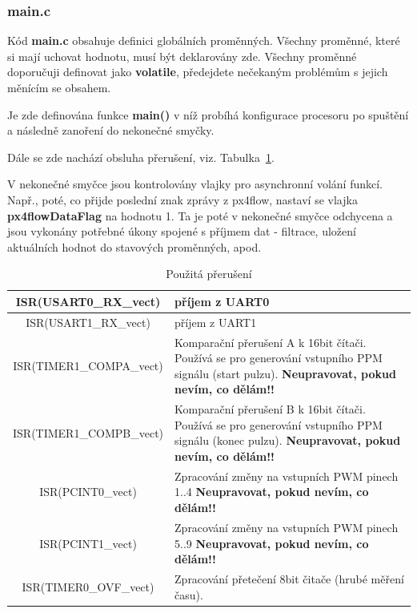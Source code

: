 \documentclass[11pt, a4paper]{article}
\begin{document}
\subsubsection{main.c}

Kód \textbf{main.c} obsahuje definici globálních proměnných. Všechny proměnné, které si mají uchovat hodnotu, musí být deklarovány zde. Všechny proměnné doporučuji definovat jako \textbf{volatile}, předejdete nečekaným problémům s jejich měnícím se obsahem.

Je zde definována funkce \textbf{main()} v níž probíhá konfigurace procesoru po spuštění a následně zanoření do nekonečné smyčky.

Dále se zde nachází obsluha přerušení, viz. Tabulka~\ref{tab:interrupts}.

V nekonečné smyčce jsou kontrolovány vlajky pro asynchronní volání funkcí. Např., poté, co přijde poslední znak zprávy z px4flow, nastaví se vlajka \textbf{px4flowDataFlag} na hodnotu 1. Ta je poté v nekonečné smyčce odchycena a jsou vykonány potřebné úkony spojené s příjmem dat - filtrace, uložení aktuálních hodnot do stavových proměnných, apod.

\begin{table}
\begin{center}
\begin{tabular}{| c | p{8cm} |}
\hline
ISR(USART0\_RX\_vect) & příjem z UART0 \\
\hline
ISR(USART1\_RX\_vect) & příjem z UART1 \\
\hline
ISR(TIMER1\_COMPA\_vect) & Komparační přerušení A k 16bit čítači. Používá se pro generování vstupního PPM signálu (start pulzu).
\newline \textbf{Neupravovat, pokud nevím, co dělám!!}\\
\hline
ISR(TIMER1\_COMPB\_vect) & Komparační přerušení B k 16bit čítači. Používá se pro generování vstupního PPM signálu (konec pulzu).
\newline \textbf{Neupravovat, pokud nevím, co dělám!!}\\
\hline
ISR(PCINT0\_vect) & Zpracování změny na vstupních PWM pinech 1..4
\newline \textbf{Neupravovat, pokud nevím, co dělám!!}\\
\hline
ISR(PCINT1\_vect) & Zpracování změny na vstupních PWM pinech 5..9
\newline \textbf{Neupravovat, pokud nevím, co dělám!!}\\
\hline
ISR(TIMER0\_OVF\_vect) & Zpracování přetečení 8bit čitače (hrubé měření času). \\
\hline
\end{tabular}
\caption{Použitá přerušení}
\label{tab:interrupts}
\end{center}
\end{table}
\end{document}
